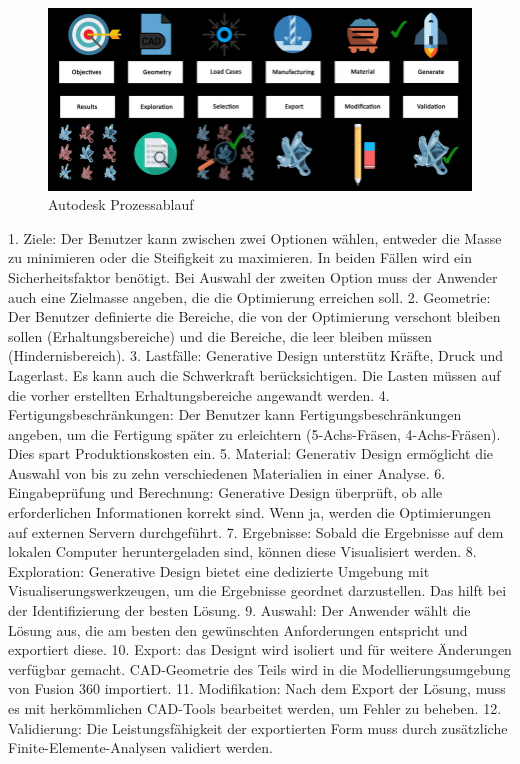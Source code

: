 \begin{figure}[h]
    \begin{minipage}{0.5\textwidth}
      \centering
      \includegraphics[width=\textwidth]{./images/Autodesk-Generative-Design-Framework.jpeg}
    \end{minipage}
    \caption{Autodesk Prozessablauf}
    \label{fig:meinbild}
  \end{figure}
  
  1.	Ziele: Der Benutzer kann zwischen zwei Optionen wählen, entweder die Masse zu minimieren oder die Steifigkeit zu maximieren. In beiden Fällen wird ein Sicherheitsfaktor benötigt. Bei Auswahl der zweiten Option muss der Anwender auch eine Zielmasse angeben, die die Optimierung erreichen soll.
  2.	Geometrie: Der Benutzer definierte die Bereiche, die von der Optimierung verschont bleiben sollen (Erhaltungsbereiche) und die Bereiche, die leer bleiben müssen (Hindernisbereich). 
  3.	Lastfälle: Generative Design unterstütz Kräfte, Druck und Lagerlast. Es kann auch die Schwerkraft berücksichtigen. Die Lasten müssen auf die vorher erstellten Erhaltungsbereiche angewandt werden. 
  4.	Fertigungsbeschränkungen: Der Benutzer kann Fertigungsbeschränkungen angeben, um die Fertigung später zu erleichtern (5-Achs-Fräsen, 4-Achs-Fräsen). Dies spart Produktionskosten ein.
  5.	Material: Generativ Design ermöglicht die Auswahl von bis zu zehn verschiedenen Materialien in einer Analyse. 
  6.	Eingabeprüfung und Berechnung: Generative Design überprüft, ob alle erforderlichen Informationen korrekt sind. Wenn ja, werden die Optimierungen auf externen Servern durchgeführt. 
  7.	Ergebnisse: Sobald die Ergebnisse auf dem lokalen Computer heruntergeladen sind, können diese Visualisiert werden. 
  8.	Exploration: Generative Design bietet eine dedizierte Umgebung mit Visualiserungswerkzeugen, um die Ergebnisse geordnet darzustellen. Das hilft bei der Identifizierung der besten Lösung.
  9.	Auswahl: Der Anwender wählt die Lösung aus, die am besten den gewünschten Anforderungen entspricht und exportiert diese.
  10.	Export: das Designt wird isoliert und für weitere Änderungen verfügbar gemacht. \ac*{CAD}-Geometrie des Teils wird in die Modellierungsumgebung von Fusion 360 importiert.
  11.	Modifikation: Nach dem Export der Lösung, muss es mit herkömmlichen \ac*{CAD}-Tools bearbeitet werden, um Fehler zu beheben.
  12.	Validierung: Die Leistungsfähigkeit der exportierten Form muss durch zusätzliche Finite-Elemente-Analysen validiert werden. \autocite*{7}

